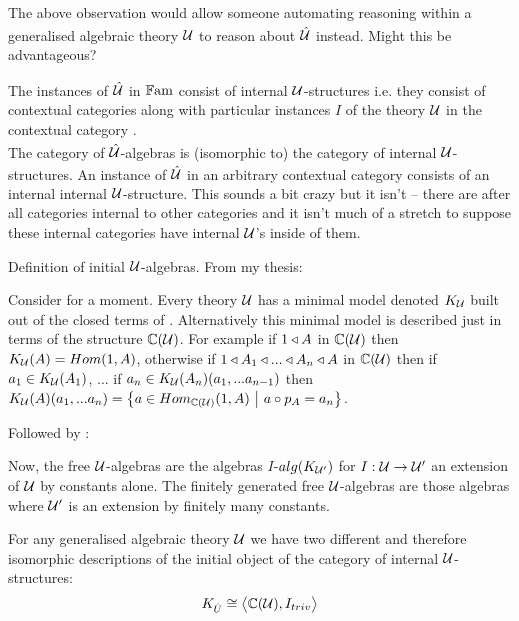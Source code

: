 \begin{notebox}[Question]
The above observation would allow someone automating reasoning within  a generalised algebraic theory 
$\gatU$ to reason about $\hatU$ instead. Might this be advantageous? 
\end{notebox}

\note 
The instances of $\hatU$  in $\Fam$ consist of  internal $\gat[U]$-structures  i.e. they consist of contextual categories \catcw along with particular instances $I$ of
the theory $\gat[U]$ in the contextual category \catc. \\
The category of $\hatU$-algebras is (isomorphic to) the category of internal $\gatU$-structures.
\note
An instance of $\hatU$ in an arbitrary contextual category
consists of  an internal internal $\gat[U]$-structure. This sounds a bit crazy but it isn't -- there are after all categories internal to other categories and it isn't much of a stretch to suppose these internal categories have internal $\gat[U]$'s inside of them. 

\note 
Definition of initial $\gat[U]$-algebras. From my thesis:
\begin{tightquote}
Consider for a moment. Every theory $\gat[U]$ has a minimal model denoted $\KU$ built out of the closed terms of \gat[U]. Alternatively this minimal model is described just in terms of the structure $\CofU$. For example
if $1 \base A$ in $\CofU$ then 
$\KU(A)=Hom(1,A)$, otherwise if $1 \base A_1 \base ... \base A_n \base A$ in $\CofU$
then if $a_1 \in \KU(A_1)$, ... if $a_n \in \KU(A_n)(a_1,...a_{n-1})$ then 
$\KU(A)(a_1,...a_n)=\setsuchthat{a\in Hom_{\CofU}(1,A)}{a \circ p_A = a_n}$. \\
\end{tightquote} 

Followed by :
\begin{tightquote}
Now, the free $\gat[U]$-algebras are the algebras $I$-$alg(\KUp)$ for $I: \gat[U] \morph \gat[U']$ an extension of $\gat[U]$ by constants alone. The finitely generated free $\gat[U]$-algebras are those algebras where $\gat[U']$ is an extension by finitely many constants. \\
\end{tightquote}

\note
\label{termmodelEQfreealgebra}For any generalised algebraic theory $\gat[U]$ we have two different 
and therefore isomorphic descriptions of the initial object of the category of internal $\gatU$-structures:\\
\begin{equation}
K_{\hat{U}} \cong \bigtuple{\CofU, I_{triv}}
\end{equation}

